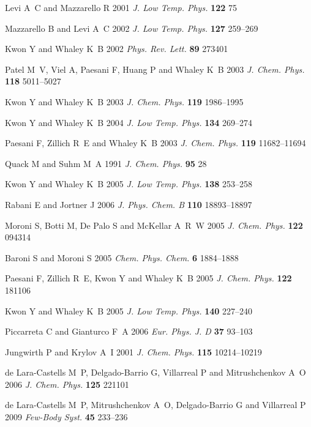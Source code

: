 \documentclass[12pt]{iopart}
\begin{document}
\begin{thebibliography}{100}
Levi A~C and Mazzarello R 2001 {\em J. Low Temp. Phys.\/} {\bf 122} 75

Mazzarello B and Levi A~C 2002 {\em J. Low Temp. Phys.\/} {\bf 127} 259--269

Kwon Y and Whaley K~B 2002 {\em Phys. Rev. Lett.\/} {\bf 89} 273401

Patel M~V, Viel A, Paesani F, Huang P and Whaley K~B 2003 {\em J. Chem.
  Phys.\/} {\bf 118} 5011--5027

Kwon Y and Whaley K~B 2003 {\em J. Chem. Phys.\/} {\bf 119} 1986--1995

Kwon Y and Whaley K~B 2004 {\em J. Low Temp. Phys.\/} {\bf 134} 269--274

Paesani F, Zillich R~E and Whaley K~B 2003 {\em J. Chem. Phys.\/} {\bf 119}
  11682--11694

Quack M and Suhm M~A 1991 {\em J. Chem. Phys.\/} {\bf 95} 28

Kwon Y and Whaley K~B 2005 {\em J. Low Temp. Phys.\/} {\bf 138} 253--258

Rabani E and Jortner J 2006 {\em J. Phys. Chem. B\/} {\bf 110} 18893--18897

Moroni S, Botti M, {De Palo} S and McKellar A~R~W 2005 {\em J. Chem. Phys.\/}
  {\bf 122} 094314

Baroni S and Moroni S 2005 {\em Chem. Phys. Chem.\/} {\bf 6} 1884--1888

Paesani F, Zillich R~E, Kwon Y and Whaley K~B 2005 {\em J. Chem. Phys.\/} {\bf
  122} 181106

Kwon Y and Whaley K~B 2005 {\em J. Low Temp. Phys.\/} {\bf 140} 227--240

Piccarreta C and Gianturco F~A 2006 {\em Eur. Phys. J. D\/} {\bf 37} 93--103

Jungwirth P and Krylov A~I 2001 {\em J. Chem. Phys.\/} {\bf 115} 10214--10219

{de Lara-Castells} M~P, {Delgado-Barrio} G, Villarreal P and Mitrushchenkov A~O
  2006 {\em J. Chem. Phys.\/} {\bf 125} 221101

{de Lara-Castells} M~P, Mitrushchenkov A~O, {Delgado-Barrio} G and Villarreal P
  2009 {\em Few-Body Syst.\/} {\bf 45} 233--236


\end{thebibliography}
\end{document}
